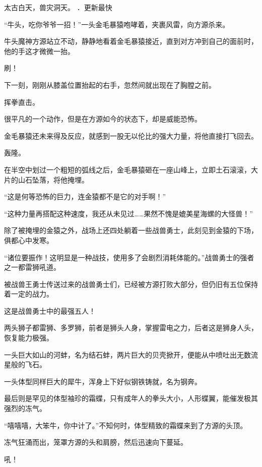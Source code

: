 
\begin{this_body}



太古白天，兽灾洞天。 ．更新最快

“牛头，吃你爷爷一招！”一头金毛暴猿咆哮着，夹裹风雷，向方源杀来。

牛头魔神方源站立不动，静静地看着金毛暴猿接近，直到对方冲到自己的面前时，他的手这才微微一抬。

刷！

下一刻，刚刚从膝盖位置抬起的右手，忽然间就出现在了胸膛之前。

挥拳直击。

很平凡的一个动作，但是在方源如今的状态下，却是威能恐怖。

金毛暴猿还未来得及反应，就感到一股无以伦比的强大力量，将他直接打飞回去。

轰隆。

在半空中划过一个粗短的弧线之后，金毛暴猿砸在一座山峰上，立即土石滚滚，大片的山石坠落，将他掩埋。

“这是何等恐怖的巨力，连金猿都不是它的对手啊！”

“这种力量再搭配这种速度，我还从未见过……果然不愧是媲美星海螺的大怪兽！”

除了被掩埋的金猿之外，战场上还四处躺着一些战兽勇士，此刻见到金猿的下场，俱都心中发寒。

“诸位要振作！这明显是一种战技，使用多了会剧烈消耗体能的。”战兽勇士的强者之一都雷狮吼道。

被战兽王勇士传送过来的战兽勇士们，已经被方源打败大部分，但仍旧有五位保持着一定的战力。

这是战兽勇士中的最强五人！

两头狮子都雷狮、多罗狮，前者是狮头人身，掌握雷电之力，后者这是狮身人头，恢复能力极强。

一头巨大如山的河蚌，名为结石蚌，两片巨大的贝壳掀开，便能从中喷吐出无数流星般的飞石。

一头体型同样巨大的犀牛，浑身上下好似钢铁铸就，名为钢奔。

最后则是罕见的体型袖珍的霜蝶，只有成年人的拳头大小，人形蝶翼，能催发极其强烈的冻气。

“嘻嘻嘻，大笨牛，你中计了。”不知何时，体型精致的霜蝶来到了方源的头顶。

冻气狂涌而出，笼罩方源的头和肩膀，然后迅速向下蔓延。

吼！


\end{this_body}
